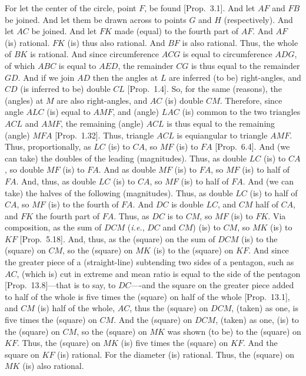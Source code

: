 \begin{Parallel}{}{}
{For let the center of the circle, point $F$, be found [Prop.~3.1].
And let $AF$ and $FB$ be joined. And let them be drawn
across to points $G$ and $H$ (respectively). And let $AC$ be joined.
And let $FK$ made (equal) to the fourth part of $AF$. And $AF$ (is) rational. $FK$ (is) thus also rational. And $BF$ is also rational. Thus,
the whole of $BK$ is rational. And since circumference $ACG$ is equal
to circumference $ADG$, of which $ABC$ is equal to $AED$, the
remainder $CG$ is thus equal to the remainder $GD$.
And if we join $AD$ then the angles at $L$ are inferred (to be) right-angles, 
and $CD$ (is inferred to be) double $CL$ [Prop.~1.4].  So, for the same (reasons), 
the (angles) at $M$ are also right-angles, and $AC$ (is) double $CM$. Therefore,
since angle $ALC$ (is) equal to $AMF$, and (angle) $LAC$ (is) common
to the two triangles $ACL$ and $AMF$, the remaining (angle) $ACL$ is thus
equal to the remaining (angle) $MFA$ [Prop.~1.32]. Thus, triangle 
$ACL$  is equiangular to triangle $AMF$. Thus, proportionally, 
as $LC$ (is) to $CA$, so $MF$ (is) to $FA$ [Prop.~6.4]. And (we can take) the
doubles of the leading (magnitudes). Thus, as double $LC$ (is) to $CA$,
so double $MF$ (is) to $FA$. And as double $MF$ (is) to $FA$, so
$MF$ (is) to half of $FA$. And, thus, as double $LC$ (is) to $CA$,
so $MF$ (is) to half of $FA$. And (we can take) the halves of the following
(magnitudes). Thus, as double $LC$ (is) to half of $CA$, so $MF$
(is) to the fourth of $FA$. And $DC$ is double $LC$, and  $CM$ half
of $CA$, and $FK$ the fourth part of $FA$.  Thus, as $DC$
is to $CM$, so $MF$ (is) to $FK$. Via composition, as the
sum of $DCM$ ({\em i.e.}, $DC$ and $CM$)
(is) to $CM$, so $MK$ (is) to $KF$ [Prop.~5.18]. And, thus, as the (square) on the
sum of $DCM$ (is) to the (square) on $CM$, so the (square) on $MK$
(is) to the (square) on $KF$. And since the
greater piece of a (straight-line) subtending two sides of a
pentagon, such as $AC$, (which is) cut in extreme and mean ratio is equal to the side of the pentagon [Prop.~13.8]---that is to say,
to $DC$----and the square on the greater piece added to half of the
whole is five times the (square) on half of the whole [Prop.~13.1], 
and $CM$ (is) half of the whole, $AC$, thus the (square) on
$DCM$, (taken) as one, is five times the (square) on $CM$.
And the (square) on $DCM$, (taken) as one,  (is)  to the (square) on $CM$, so the (square) on $MK$ was shown (to be) to the (square) on 
$KF$.  Thus, the (square) on $MK$ (is) five times the (square) on 
$KF$. And the square on $KF$ (is) rational. For the diameter
(is) rational. Thus, the (square) on $MK$ (is) also rational. 
}
\end{Parallel}

